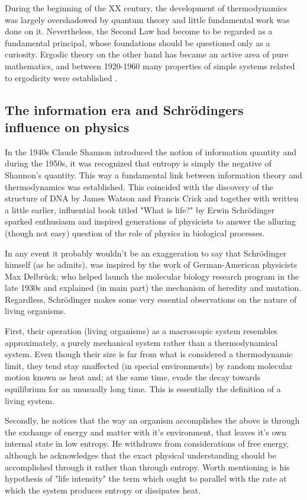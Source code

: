 \documentclass[a4paper,12pt]{article}
\begin{document}
During the beginning of the XX century, the development of thermodynamics was largely overshadowed by quantum theory and little fundamental work was done on it. 
Nevertheless, the Second Law had become to be regarded as a fundamental principal, whose foundations should be questioned only as a curiosity. Ergodic theory on the other hand has became an active area of pure mathematics, and between 1920-1960 many properties of simple systems related to ergodicity were established \cite{Wolfram:552851}.

\subsection{The information era and Schrödingers influence on physics}

In the 1940s Claude Shannon introduced the notion of information quantity and during the 1950s, it was recognized that entropy is simply the negative of Shannon's quantity. This way a fundamental link between information theory and thermodynamics was established. This coincided with the discovery of the structure of DNA by James Watson and Francis Crick and together with written a little earlier, influential book titled "What is life?" by  Erwin Schrödinger sparked enthusiasm and inspired generations of physicists to answer the alluring (though not easy) question of the role of physics in biological processes. 

In any event it probably wouldn't be an exaggeration to say that Schrödinger himself (as he admits), was inspired by the work of German-American physicists Max Delbrück; who helped launch the molecular biology research program in the late 1930s and explained (in main part) the mechanism of heredity and mutation.
Regardless, Schrödinger makes some very essential observations on the nature of living organisms.

First, their operation (living organisms) as a macroscopic system resembles approximately, a purely mechanical system rather than a thermodynamical system. 
Even though their size is far from what is considered a thermodynamic limit, they tend stay unaffected (in special environments) by random molecular motion known as heat and; at the same time, evade the decay towards equilibrium for an unusually long time. This is essentially the definition of a living system.

Secondly, he notices that the way an organism accomplishes the above is through the exchange of energy and matter with it's environment, that leaves it's own internal state in low entropy. He withdraws from considerations of free energy, although he acknowledges that the exact physical understanding should be accomplished through it rather than through entropy. Worth mentioning is his hypothesis of "life intensity" the term which ought to parallel with the rate at which the system produces entropy or dissipates heat.
\end{document}
